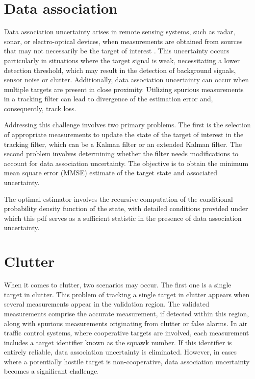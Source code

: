 \section{Data association}
\label{sec:data_association}
Data association uncertainty arises in remote sensing systems, such as radar, sonar, or electro-optical devices, when
measurements are obtained from sources that may not necessarily be the target of interest \cite{BarShalomPDA}. This uncertainty
occurs particularly in situations where the target signal is weak, necessitating a lower detection threshold, which may result in the detection of background signals, sensor noise or clutter. Additionally, data association uncertainty can occur when multiple targets are present in close proximity. Utilizing spurious measurements in a tracking filter can lead to divergence of the estimation error and, consequently, track loss.

Addressing this challenge involves two primary problems. The first is the selection of appropriate measurements to
update the state of the target of interest in the tracking filter, which can be a Kalman filter or an extended Kalman
filter. The second problem involves determining whether the filter needs modifications to account for data
association uncertainty. The objective is to obtain the minimum mean square error (MMSE) estimate of the target state
and associated uncertainty.

The optimal estimator involves the recursive computation of the conditional probability density function of the
state, with detailed conditions provided under which this pdf serves as a sufficient statistic in the presence of
data association uncertainty.

\section{Clutter}
When it comes to clutter, two scenarios may occur. The first one is a single target in clutter. This problem of
tracking a single target in clutter appears when several measurements appear in the validation region. The
validated measurements comprise the accurate measurement, if detected within this region, along with spurious
measurements originating from clutter or false alarms. In air traffic control systems, where cooperative targets are
involved, each measurement includes a target identifier known as the squawk number. If this identifier is entirely
reliable, data association uncertainty is eliminated. However, in cases where a potentially hostile target is non-cooperative, data association uncertainty becomes a significant challenge.

